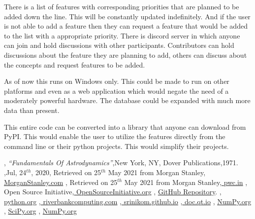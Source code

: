 \documentclass[12pt]{article}
\begin{document}
There is a list of features with corresponding priorities that are planned to be added down the line. This will be constantly updated indefinitely. And if the user is not able to add a feature then they can request a feature that would be added to the list with a appropriate priority. There is discord server in which anyone can join and hold discussions with other participants. Contributors can hold discussions about the feature they are planning to add, others can discuss about the concepts and request features to be added. 

As of now this runs on Windows only. This could be made to run on other platforms and even as a web application which would negate the need of a moderately powerful hardware. The database could be expanded with much more data than present.

This entire code can be converted into a library that anyone can download from PyPI. This would enable the user to utilize the features directly from the command line or their python projects. This would simplify their projects.
\begin{thebibliography}{99}
	,{ \textit{\enquote{Fundamentals Of Astrodynamics}}},{New York, NY},{ Dover Publications},{1971}.
	,{Jul, 24$^{th}$, 2020}, { Retrieved on 25$^{th}$ May 2021 from Morgan Stanley},{\href{https://www.morganstanley.com/ideas/investing-in-space}{ MorganStanley.com}}
	,{ Retrieved on 25$^{th}$ May 2021 from Morgan Stanley},{\href{https://www.pwc.in/research-insights/2020/preparing-to-scale-new-heights.html}{ pwc.in}}
	,{ Open Source Initiative},{\href{https://opensource.org/licenses/gpl-3.0.html}{ OpenSourceInitiative.org}}
	, {\href{https://github.com/iamlrk/MOPy}{GitHub Repository}}.
		,{\href{https://docs.python.org}{ python.org}}
	,{\href{https://www.riverbankcomputing.com/static/Docs/PyQt5/}{ riverbankcomputing.com}}
	,{\href{https://srinikom.github.io/pyside-docs/pysideapi2.html}{ srinikom.github.io}}
	,{\href{https://doc.qt.io/qt-5/qtdesigner-manual.html}{ doc.qt.io}}	
	, {\href{https://numpy.org/doc}{ NumPy.org}}
	, {\href{https://scipy.org/doc}{ SciPy.org}}
	, {\href{https://numpy.org/doc}{ NumPy.org}}
\end{thebibliography}
\end{document}
